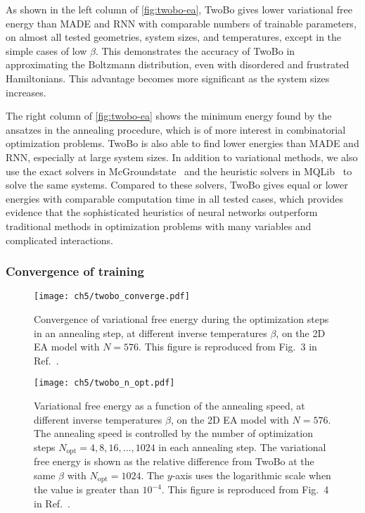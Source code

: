 As shown in the left column of \cref{fig:twobo-ea}, TwoBo gives lower variational free energy than MADE and RNN with comparable numbers of trainable parameters, on almost all tested geometries, system sizes, and temperatures, except in the simple cases of low $\beta$. This demonstrates the accuracy of TwoBo in approximating the Boltzmann distribution, even with disordered and frustrated Hamiltonians. This advantage becomes more significant as the system sizes increases.

The right column of \cref{fig:twobo-ea} shows the minimum energy found by the ansatzes in the annealing procedure, which is of more interest in combinatorial optimization problems. TwoBo is also able to find lower energies than MADE and RNN, especially at large system sizes. In addition to variational methods, we also use the exact solvers in McGroundstate~\cite{charfreitag2022mcsparse} and the heuristic solvers in MQLib~\cite{dunning2018what} to solve the same systems. Compared to these solvers, TwoBo gives equal or lower energies with comparable computation time in all tested cases, which provides evidence that the sophisticated heuristics of neural networks outperform traditional methods in optimization problems with many variables and complicated interactions.

\subsubsection{Convergence of training}

\begin{figure}[htb]
\centering
\texttt{[image: ch5/twobo\_converge.pdf]}
\caption[Convergence of TwoBo variational free energy in training]{
Convergence of variational free energy during the optimization steps in an annealing step, at different inverse temperatures $\beta$, on the 2D EA model with $N = 576$.
This figure is reproduced from Fig.~3 in Ref.~\cite{biazzo2024sparse}.
}
\label{fig:twobo-converge}
\end{figure}

\begin{figure}[htb]
\centering
\texttt{[image: ch5/twobo\_n\_opt.pdf]}
\caption[TwoBo variational free energy vs.\ annealing speed]{
Variational free energy as a function of the annealing speed, at different inverse temperatures $\beta$, on the 2D EA model with $N = 576$.
The annealing speed is controlled by the number of optimization steps $N_\text{opt} = 4, 8, 16, \ldots, 1024$ in each annealing step.
The variational free energy is shown as the relative difference from TwoBo at the same $\beta$ with $N_\text{opt} = 1024$.
The $y$-axis uses the logarithmic scale when the value is greater than $10^{-4}$.
This figure is reproduced from Fig.~4 in Ref.~\cite{biazzo2024sparse}.
}
\label{fig:twobo-n-opt}
\end{figure}

